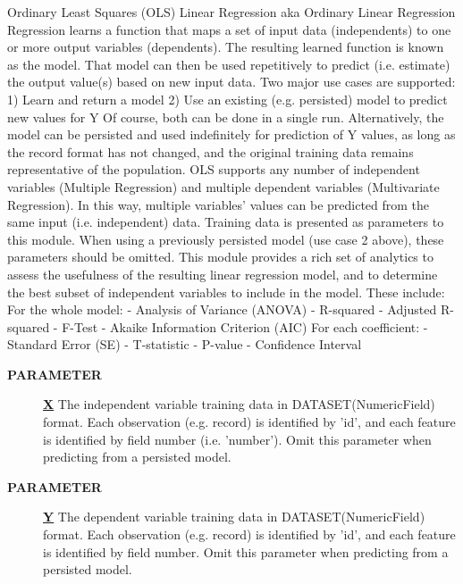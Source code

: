 \par
Ordinary Least Squares (OLS) Linear Regression aka Ordinary Linear Regression Regression learns a function that maps a set of input data (independents) to one or more output variables (dependents). The resulting learned function is known as the model. That model can then be used repetitively to predict (i.e. estimate) the output value(s) based on new input data. Two major use cases are supported: 1) Learn and return a model 2) Use an existing (e.g. persisted) model to predict new values for Y Of course, both can be done in a single run. Alternatively, the model can be persisted and used indefinitely for prediction of Y values, as long as the record format has not changed, and the original training data remains representative of the population. OLS supports any number of independent variables (Multiple Regression) and multiple dependent variables (Multivariate Regression). In this way, multiple variables' values can be predicted from the same input (i.e. independent) data. Training data is presented as parameters to this module. When using a previously persisted model (use case 2 above), these parameters should be omitted. This module provides a rich set of analytics to assess the usefulness of the resulting linear regression model, and to determine the best subset of independent variables to include in the model. These include: For the whole model: - Analysis of Variance (ANOVA) - R-squared - Adjusted R-squared - F-Test - Akaike Information Criterion (AIC) For each coefficient: - Standard Error (SE) - T-statistic - P-value - Confidence Interval

\par
\begin{description}
\item [\colorbox{tagtype}{\color{white} \textbf{\textsf{PARAMETER}}}] \textbf{\underline{X}} The independent variable training data in DATASET(NumericField) format. Each observation (e.g. record) is identified by 'id', and each feature is identified by field number (i.e. 'number'). Omit this parameter when predicting from a persisted model.
\item [\colorbox{tagtype}{\color{white} \textbf{\textsf{PARAMETER}}}] \textbf{\underline{Y}} The dependent variable training data in DATASET(NumericField) format. Each observation (e.g. record) is identified by 'id', and each feature is identified by field number. Omit this parameter when predicting from a persisted model.
\end{description}

